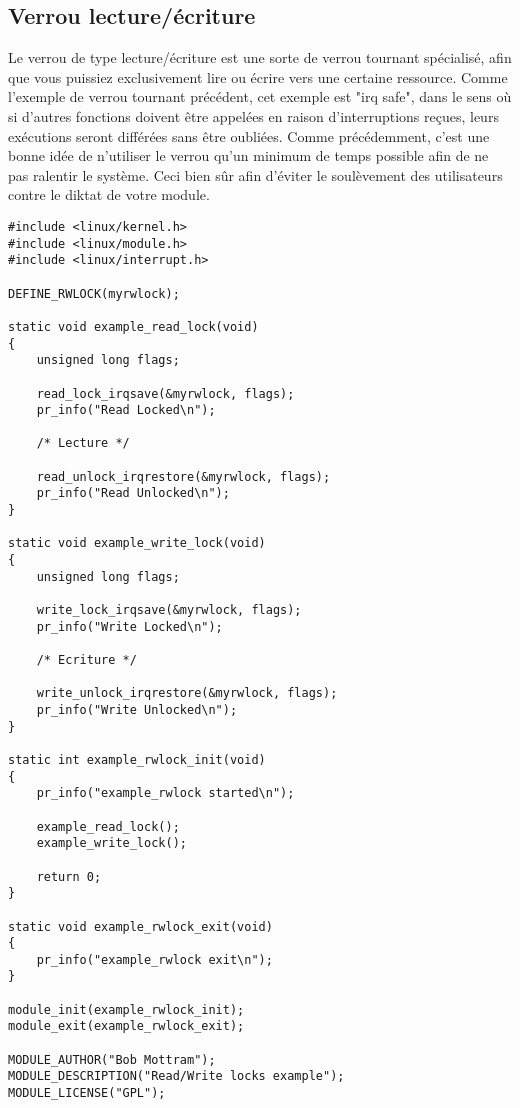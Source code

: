 \documentclass[11pt]{article}
\begin{document}
\subsection*{Verrou lecture/écriture}
\label{sec-12-3}
Le verrou de type lecture/écriture est une sorte de verrou tournant spécialisé, afin que vous puissiez exclusivement lire ou écrire vers une certaine ressource. Comme l'exemple de verrou tournant précédent, cet exemple est "irq safe", dans le sens où si d'autres fonctions doivent être appelées en raison d'interruptions reçues, leurs exécutions seront différées sans être oubliées. Comme précédemment, c'est une bonne idée de n'utiliser le verrou qu'un minimum de temps possible afin de ne pas ralentir le système. Ceci bien sûr afin d'éviter le soulèvement des utilisateurs contre le diktat de votre module.

\begin{verbatim}
#include <linux/kernel.h>
#include <linux/module.h>
#include <linux/interrupt.h>

DEFINE_RWLOCK(myrwlock);

static void example_read_lock(void)
{
    unsigned long flags;

    read_lock_irqsave(&myrwlock, flags);
    pr_info("Read Locked\n");

    /* Lecture */

    read_unlock_irqrestore(&myrwlock, flags);
    pr_info("Read Unlocked\n");
}

static void example_write_lock(void)
{
    unsigned long flags;

    write_lock_irqsave(&myrwlock, flags);
    pr_info("Write Locked\n");

    /* Ecriture */

    write_unlock_irqrestore(&myrwlock, flags);
    pr_info("Write Unlocked\n");
}

static int example_rwlock_init(void)
{
    pr_info("example_rwlock started\n");

    example_read_lock();
    example_write_lock();

    return 0;
}

static void example_rwlock_exit(void)
{
    pr_info("example_rwlock exit\n");
}

module_init(example_rwlock_init);
module_exit(example_rwlock_exit);

MODULE_AUTHOR("Bob Mottram");
MODULE_DESCRIPTION("Read/Write locks example");
MODULE_LICENSE("GPL");
\end{verbatim}
\end{document}
